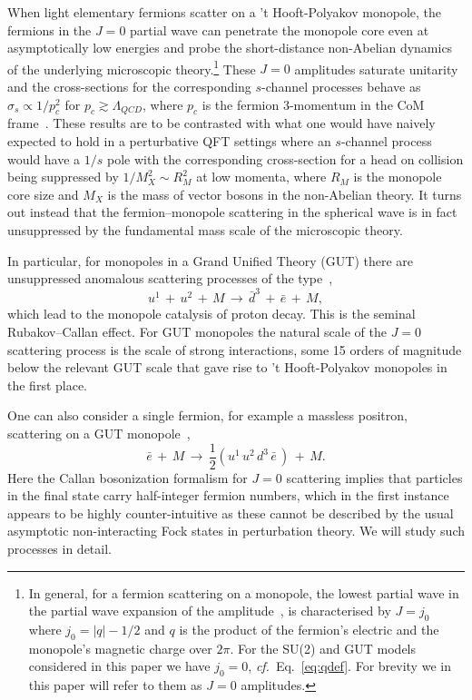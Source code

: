 \documentclass[a4paper,11pt]{article}
\begin{document}
When light elementary fermions scatter on a 't Hooft-Polyakov monopole, the fermions in the $J=0$ partial wave can penetrate the monopole core even 
at asymptotically low energies and probe the short-distance non-Abelian dynamics of the underlying microscopic theory.\footnote{In general, for a fermion scattering on a monopole, the lowest partial wave in the partial wave expansion of the amplitude~\cite{Wu:1976ge,Kazama:1976fm}, is characterised by $J=j_0$ where $j_0=|q|-1/2$ and $q$ is the product of the fermion's electric and the monopole's magnetic charge over $2\pi$. For the SU(2) and GUT models considered in this paper we have $j_0=0$, {\it cf.}~Eq.~\eqref{eq:qdef}. For brevity we in this paper will refer to them as $J=0$ amplitudes.}
These $J=0$ amplitudes saturate unitarity and the cross-sections for the corresponding $s$-channel processes behave as
 $\sigma_s \propto 1/p_c^2$ for $p_c \gtrsim \Lambda_{QCD}$, where $p_c$ is the fermion 3-momentum in the CoM frame~\cite{Kazama:1976fm,Rubakov:1981rg,Callan:1982ah,Callan:1982au}. 
These results are to be contrasted with 
what one would have naively expected to hold in a perturbative QFT settings where  an $s$-channel process would have a $1/s$ pole with the corresponding cross-section for a head on collision being suppressed by $1/M_X^2 \sim R_M^2 $ at low momenta, where $R_M$ is the monopole core size and $M_X$ is the mass of vector bosons in the non-Abelian theory. 
It turns out instead that the fermion--monopole scattering in the spherical wave is in fact unsuppressed by the fundamental mass scale of the microscopic theory. 

In particular, for monopoles in a Grand Unified Theory (GUT) there are unsuppressed anomalous scattering processes of the type~\cite{Rubakov:1981rg,Callan:1982ah},
\begin{equation}
\label{eq:m-cat-p}
 u^1 \,+\,u^2 \,+\,  M \,\to\, \bar{d}^{3} \,+\, \bar{e} \,+\,  M,
\end{equation}  
which lead to the monopole catalysis of proton decay. This is the seminal Rubakov--Callan effect.
For GUT monopoles the natural scale of the $J=0$ scattering process is the scale of strong interactions, some 15 orders of magnitude below the relevant GUT scale that gave rise to 't Hooft-Polyakov monopoles in the first place. 

One can also consider a single fermion, for example a massless positron, scattering on a GUT monopole~\cite{Callan:1982au},
\begin{equation}
\label{eq:callan}
 \bar{e} \,+\,  M \,\to\, \frac{1}{2} \left(u^1\,u^2\,d^3\,\bar{e} \,\right) \,+\,  M.
\end{equation} 
Here the Callan bosonization formalism for $J=0$ scattering implies that particles in the final state carry half-integer fermion numbers, 
which in the first instance appears to be highly counter-intuitive as these cannot be described by the usual asymptotic non-interacting Fock states in perturbation theory.
We will study such processes in detail.
\end{document}

